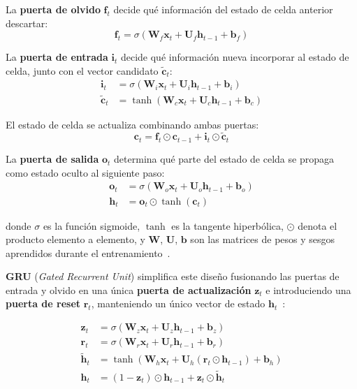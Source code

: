 \documentclass[12pt, a4paper]{article}
\begin{document}
La \textbf{puerta de olvido} $\mathbf{f}_t$ decide qué información del estado de celda anterior descartar:
\begin{equation}
\mathbf{f}_t = \sigma(\mathbf{W}_f \mathbf{x}_t + \mathbf{U}_f \mathbf{h}_{t-1} + \mathbf{b}_f)
\end{equation}

La \textbf{puerta de entrada} $\mathbf{i}_t$ decide qué información nueva incorporar al estado de celda, junto con el vector candidato $\tilde{\mathbf{c}}_t$:
\begin{align}
\mathbf{i}_t &= \sigma(\mathbf{W}_i \mathbf{x}_t + \mathbf{U}_i \mathbf{h}_{t-1} + \mathbf{b}_i) \\
\tilde{\mathbf{c}}_t &= \tanh(\mathbf{W}_c \mathbf{x}_t + \mathbf{U}_c \mathbf{h}_{t-1} + \mathbf{b}_c)
\end{align}

El estado de celda se actualiza combinando ambas puertas:
\begin{equation}
\mathbf{c}_t = \mathbf{f}_t \odot \mathbf{c}_{t-1} + \mathbf{i}_t \odot \tilde{\mathbf{c}}_t
\end{equation}

La \textbf{puerta de salida} $\mathbf{o}_t$ determina qué parte del estado de celda se propaga como estado oculto al siguiente paso:
\begin{align}
\mathbf{o}_t &= \sigma(\mathbf{W}_o \mathbf{x}_t + \mathbf{U}_o \mathbf{h}_{t-1} + \mathbf{b}_o) \\
\mathbf{h}_t &= \mathbf{o}_t \odot \tanh(\mathbf{c}_t)
\end{align}

donde $\sigma$ es la función sigmoide, $\tanh$ es la tangente hiperbólica, $\odot$ denota el producto elemento a elemento, y $\mathbf{W}$, $\mathbf{U}$, $\mathbf{b}$ son las matrices de pesos y sesgos aprendidos durante el entrenamiento~\cite{hochreiter1997}.

\textbf{GRU} (\textit{Gated Recurrent Unit}) simplifica este diseño fusionando las puertas de entrada y olvido en una única \textbf{puerta de actualización} $\mathbf{z}_t$ e introduciendo una \textbf{puerta de reset} $\mathbf{r}_t$, manteniendo un único vector de estado $\mathbf{h}_t$~\cite{cho2014}:

\begin{align}
\mathbf{z}_t &= \sigma(\mathbf{W}_z \mathbf{x}_t + \mathbf{U}_z \mathbf{h}_{t-1} + \mathbf{b}_z) \\
\mathbf{r}_t &= \sigma(\mathbf{W}_r \mathbf{x}_t + \mathbf{U}_r \mathbf{h}_{t-1} + \mathbf{b}_r) \\
\tilde{\mathbf{h}}_t &= \tanh(\mathbf{W}_h \mathbf{x}_t + \mathbf{U}_h (\mathbf{r}_t \odot \mathbf{h}_{t-1}) + \mathbf{b}_h) \\
\mathbf{h}_t &= (1 - \mathbf{z}_t) \odot \mathbf{h}_{t-1} + \mathbf{z}_t \odot \tilde{\mathbf{h}}_t
\end{align}
\end{document}
